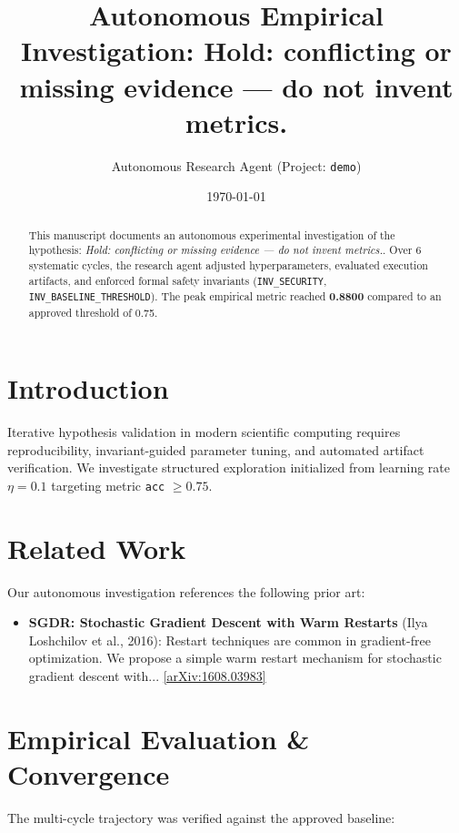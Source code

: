 \documentclass[11pt,a4paper]{article}
\title{\textbf{Autonomous Empirical Investigation: Hold: conflicting or missing evidence — do not invent metrics.}}
\author{Autonomous Research Agent (Project: \texttt{demo})}
\date{\today}
\begin{document}
\maketitle

\begin{abstract}
This manuscript documents an autonomous experimental investigation of the hypothesis: \emph{Hold: conflicting or missing evidence — do not invent metrics.}. 
Over 6 systematic cycles, the research agent adjusted hyperparameters, evaluated execution artifacts, 
and enforced formal safety invariants (\texttt{INV\_SECURITY}, \texttt{INV\_BASELINE\_THRESHOLD}). 
The peak empirical metric reached \textbf{0.8800} compared to an approved threshold of 0.75.
\end{abstract}

\section{Introduction}
Iterative hypothesis validation in modern scientific computing requires reproducibility, invariant-guided parameter tuning, 
and automated artifact verification. We investigate structured exploration initialized from learning rate $\eta = 0.1$ 
targeting metric \texttt{acc} $\ge 0.75$.

\section{Related Work}
Our autonomous investigation references the following prior art:
\begin{itemize}
    \item \textbf{SGDR: Stochastic Gradient Descent with Warm Restarts} (Ilya Loshchilov et al., 2016): Restart techniques are common in gradient-free optimization. We propose a simple warm restart mechanism for stochastic gradient descent with... \href{https://arxiv.org/pdf/1608.03983}{[arXiv:1608.03983]}
\end{itemize}

\section{Empirical Evaluation & Convergence}
The multi-cycle trajectory was verified against the approved baseline:
\end{document}
